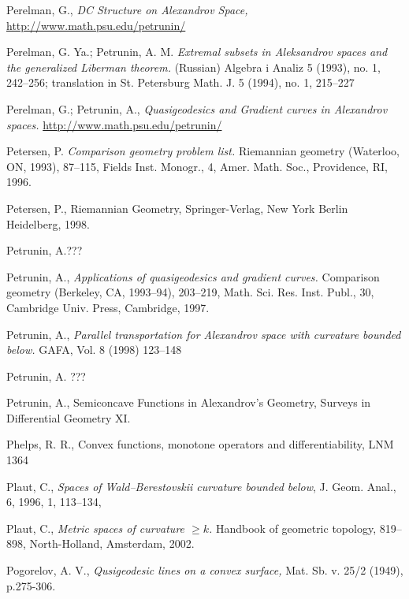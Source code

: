 \begin{thebibliography}{52}
 Perelman, G., \textit{DC Structure on Alexandrov Space,}\\ \href{http://www.math.psu.edu/petrunin/papers/papers.html}{http://www.math.psu.edu/petrunin/}

 Perelman, G. Ya.; Petrunin, A. M.
\textit{Extremal subsets in Aleksandrov spaces and the generalized Liberman theorem.}
(Russian)  Algebra i Analiz  5  (1993),  no. 1, 242--256;  translation in  St.
Petersburg Math. J.  5  (1994),  no. 1, 215--227

 Perelman, G.; Petrunin,  A., \textit{Quasigeodesics and Gradient curves in Alexandrov spaces.}
 \href{http://www.math.psu.edu/petrunin/papers/papers.html}{http://www.math.psu.edu/petrunin/}

 Petersen, P. \textit{Comparison geometry problem list.} Riemannian geometry (Waterloo, ON, 1993), 87--115,
Fields Inst. Monogr., 4, Amer. Math. Soc., Providence, RI, 1996. 

 Petersen, P., Riemannian Geometry,
Springer-Verlag, New York Berlin Heidelberg, 1998.

Petrunin, A.???

 Petrunin, A., \textit{Applications of quasigeodesics
and gradient curves.}  Comparison geometry (Berkeley, CA, 1993--94),  203--219,
Math. Sci. Res. Inst. Publ., 30, Cambridge Univ. Press, Cambridge, 1997.

 Petrunin, A., \textit{Parallel transportation for Alexandrov space with curvature bounded below.}  GAFA, Vol. 8 (1998) 123--148

 Petrunin, A. ???

 Petrunin, A.,  Semiconcave Functions in Alexandrov's Geometry, Surveys in Differential Geometry XI.

Phelps, R. R., Convex functions, monotone operators and differentiability, LNM 1364

 {Plaut, C.},
      \textit{{Spaces of Wald--Berestovskii curvature bounded below}},
    {J. Geom. Anal.},
     {6},
     {1996},
     {1},
      {113--134},

Plaut, C., \textit{Metric spaces of curvature $\ge k$.} 
Handbook of geometric topology,  819--898, North-Holland, Amsterdam, 2002.

 Pogorelov, A. V., \textit{Qusigeodesic lines on a convex surface,} Mat. Sb. v. 25/2
(1949), p.275-306.


\end{thebibliography}
